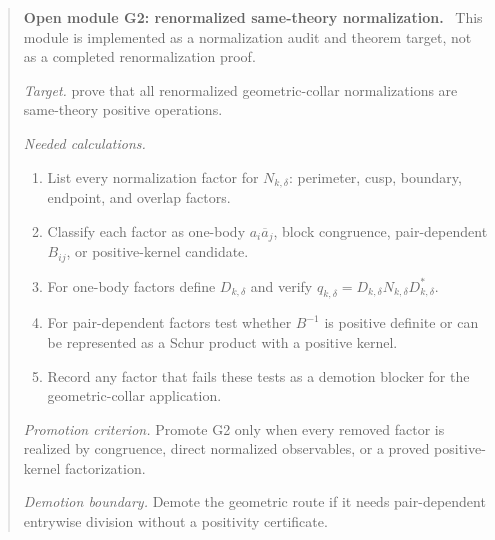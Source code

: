 \documentclass[11pt]{article}
\newenvironment{openmodule}[1]
{\begin{quote}\color{red!55!black}\textbf{Open module #1.}\ }
{\end{quote}}
\begin{document}
\begin{openmodule}{G2: renormalized same-theory normalization}
This module is implemented as a normalization audit and theorem target, not as a completed renormalization proof.

\emph{Target.} prove that all renormalized geometric-collar normalizations are same-theory positive operations.

\emph{Needed calculations.}
\begin{enumerate}[label=(\alph*)]
  \item List every normalization factor for \(N_{k,\delta}\): perimeter, cusp, boundary, endpoint, and overlap factors.
  \item Classify each factor as one-body \(a_i\overline a_j\), block congruence, pair-dependent \(B_{ij}\), or positive-kernel candidate.
  \item For one-body factors define \(D_{k,\delta}\) and verify \(q_{k,\delta}=D_{k,\delta}N_{k,\delta}D_{k,\delta}^*\).
  \item For pair-dependent factors test whether \(B^{-1}\) is positive definite or can be represented as a Schur product with a positive kernel.
  \item Record any factor that fails these tests as a demotion blocker for the geometric-collar application.
\end{enumerate}

\emph{Promotion criterion.} Promote G2 only when every removed factor is realized by congruence, direct normalized observables, or a proved positive-kernel factorization.

\emph{Demotion boundary.} Demote the geometric route if it needs pair-dependent entrywise division without a positivity certificate.
\end{openmodule}
\end{document}
